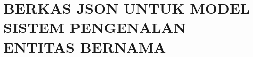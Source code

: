 \documentclass[ugmtesis]{ugmtesis}
\begin{document}
\appendix

\chapter{BERKAS JSON UNTUK MODEL SISTEM PENGENALAN ENTITAS BERNAMA}
\label{BERKAS JSON UNTUK MODEL SISTEM PENGENALAN ENTITAS BERNAMA}


\end{document}
